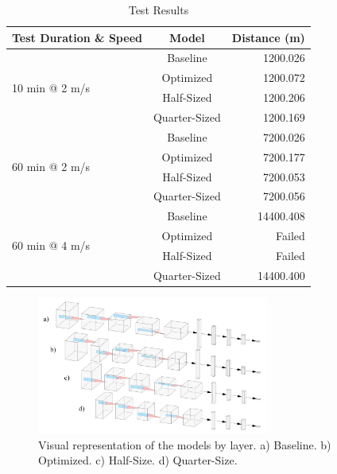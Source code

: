 \documentclass[conference]{IEEEtran}
\begin{document}
\begin{table}[ht]
    \centering
    \caption{Test Results}
    \begin{tabular}{l|c|r}
        \textbf{Test Duration \& Speed} & \textbf{Model} & \textbf{Distance (m)} \\
        \hline
        \multirow{4}{*}{10 min @ 2 m/s} & Baseline       & 1200.026              \\
                                        & Optimized      & 1200.072              \\
                                        & Half-Sized     & 1200.206              \\
                                        & Quarter-Sized  & 1200.169              \\
        \hline
        \multirow{4}{*}{60 min @ 2 m/s} & Baseline       & 7200.026              \\
                                        & Optimized      & 7200.177              \\
                                        & Half-Sized     & 7200.053              \\
                                        & Quarter-Sized  & 7200.056              \\
        \hline
        \multirow{4}{*}{60 min @ 4 m/s} & Baseline       & 14400.408             \\
                                        & Optimized      & Failed                \\
                                        & Half-Sized     & Failed                \\
                                        & Quarter-Sized  & 14400.400
    \end{tabular}
    \label{tab:testresults}
\end{table}

\begin{figure}[ht]
    \centering
    \includegraphics[width=3in]{assets/alexnet.png}
    \caption{ Visual representation of the models by layer. a) Baseline. b) Optimized. c) Half-Size. d) Quarter-Size. }
    \label{fig:alexnet}
\end{figure}
\end{document}
